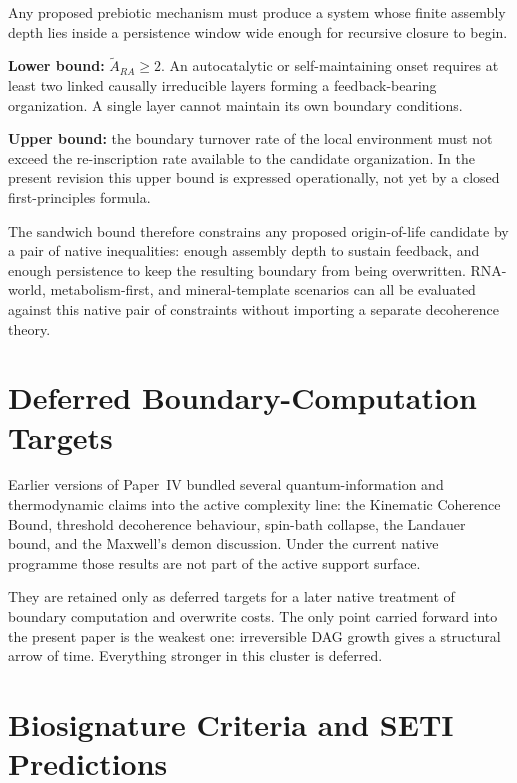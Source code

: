 \documentclass[11pt]{article}
\def\mathrm#1{#1}%
\begin{document}
Any proposed prebiotic mechanism must produce a system whose finite assembly depth lies inside a persistence window wide enough for recursive closure to begin.

\textbf{Lower bound:} $\tilde{A}_{\mathrm{RA}}\ge 2$. An autocatalytic or self-maintaining onset requires at least two linked causally irreducible layers forming a feedback-bearing organization. A single layer cannot maintain its own boundary conditions.

\textbf{Upper bound:} the boundary turnover rate of the local environment must not exceed the re-inscription rate available to the candidate organization. In the present revision this upper bound is expressed operationally, not yet by a closed first-principles formula.

The sandwich bound therefore constrains any proposed origin-of-life candidate by a pair of native inequalities: enough assembly depth to sustain feedback, and enough persistence to keep the resulting boundary from being overwritten. RNA-world, metabolism-first, and mineral-template scenarios can all be evaluated against this native pair of constraints without importing a separate decoherence theory.

\section{Deferred Boundary-Computation Targets}

Earlier versions of Paper~IV bundled several quantum-information and thermodynamic claims into the active complexity line: the Kinematic Coherence Bound, threshold decoherence behaviour, spin-bath collapse, the Landauer bound, and the Maxwell's demon discussion. Under the current native programme those results are not part of the active support surface.

They are retained only as deferred targets for a later native treatment of boundary computation and overwrite costs. The only point carried forward into the present paper is the weakest one: irreversible DAG growth gives a structural arrow of time. Everything stronger in this cluster is deferred.

\section{Biosignature Criteria and SETI Predictions}
\label{sec:seti}
\end{document}
